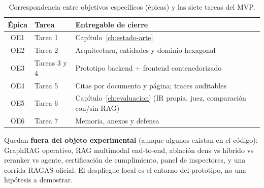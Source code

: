 \begin{table}[htbp]
\centering
\caption{Correspondencia entre objetivos específicos (épicas) y las siete tareas del MVP.}
\label{tab:objetivos-tareas}
\small
\begin{tabular}{@{}clp{8.4cm}@{}}
\toprule
\textbf{Épica} & \textbf{Tarea} & \textbf{Entregable de cierre} \\
\midrule
OE1 & Tarea 1 & Capítulo~\ref{ch:estado-arte} \\
OE2 & Tarea 2 & Arquitectura, entidades y dominio hexagonal \\
OE3 & Tareas 3 y 4 & Prototipo backend + frontend contenedorizado \\
OE4 & Tarea 5 & Citas por documento y página; traces auditables \\
OE5 & Tarea 6 & Capítulo~\ref{ch:evaluacion} (IR propia, juez, comparación con/sin RAG) \\
OE6 & Tarea 7 & Memoria, anexos y defensa \\
\bottomrule
\end{tabular}
\end{table}

Quedan \textbf{fuera del objeto experimental} (aunque algunos existan en el código): GraphRAG operativo, RAG multimodal end-to-end, ablación dens vs híbrido vs reranker vs agente, certificación de cumplimiento, panel de inspectores, y una corrida RAGAS oficial. El despliegue local es el entorno del prototipo, no una hipótesis a demostrar.

